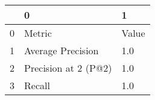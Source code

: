 \begin{tabular}{lll}
\toprule
{} &                       0 &      1 \\
\midrule
0 &                  Metric &  Value \\
1 &       Average Precision &    1.0 \\
2 &  Precision at 2 (P@2) &    1.0 \\
3 &                  Recall &    1.0 \\
\bottomrule
\end{tabular}
